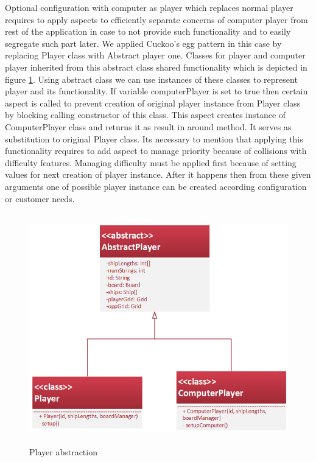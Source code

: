 \documentclass[11pt,slovak,a4paper,twoside]{article}
\begin{document}
Optional configuration with computer as player which replaces normal player requires to apply aspects to efficiently separate concerns of computer player from rest of the application in case to not provide such functionality and to easily segregate such part later. We applied Cuckoo's egg pattern in this case by replacing Player class with Abstract player one. Classes for player and computer player inherited from this abstract class shared functionality which is depicted in figure \ref{playerAbstraction}. Using abstract class we can use instances of these classes to represent player and its functionality. If variable computerPlayer is set to true then certain aspect is called to prevent creation of original player instance from Player class by blocking calling constructor of this class. This aspect creates instance of ComputerPlayer class and returns it as result in around method. It serves as substitution to original Player class. Its necessary to mention that applying this functionality requires to add aspect to manage priority because of collisions with difficulty features. Managing difficulty must be applied first because of setting values for next creation of player instance. After it happens then from these given arguments one of possible player instance can be created according configuration or customer needs.   

\begin{figure}[H]  %
					\begin{center}
									\includegraphics[height=10cm]{fig/playerAbstraction.png}
									\caption{Player abstraction}
									\label{playerAbstraction}
					\end{center}
\end{figure}
\end{document}
